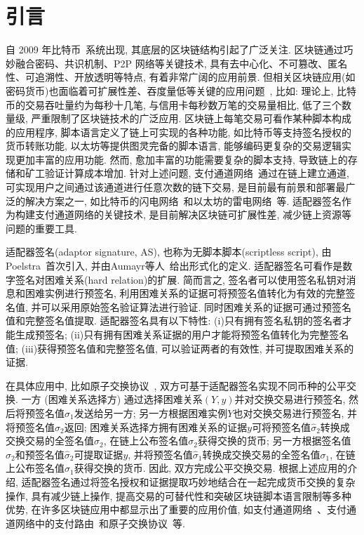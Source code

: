 \documentclass[review]{jcr}
\begin{document}

\section{引言}
自 2009 年比特币~\cite{Nak08}系统出现, 其底层的区块链结构引起了广泛关注. 区块链通过巧妙融合密码、共识机制、P2P 网络等关键技术, 具有去中心化、不可篡改、匿名性、可追溯性、开放透明等特点, 有着非常广阔的应用前景. 但相关区块链应用(如密码货币)也面临着可扩展性差、吞度量低等关键的应用问题~\cite{BanoSAAMMD19,GudgeonMRMG19,ZamyatinAZKMKK19,AumayrEEFHMMR20,SG2018}, 比如: 理论上, 比特币的交易吞吐量约为每秒十几笔, 与信用卡每秒数万笔的交易量相比, 低了三个数量级, 严重限制了区块链技术的广泛应用. 区块链上每笔交易可看作某种脚本构成的应用程序, 脚本语言定义了链上可实现的各种功能, 如比特币等支持签名授权的货币转账功能, 以太坊等提供图灵完备的脚本语言, 能够编码更复杂的交易逻辑实现更加丰富的应用功能. 然而, 愈加丰富的功能需要复杂的脚本支持, 导致链上的存储和矿工验证计算成本增加. 针对上述问题, 支付通道网络~\cite{PC2018}通过在链上建立通道, 可实现用户之间通过该通道进行任意次数的链下交易, 是目前最有前景和部署最广泛的解决方案之一, 如比特币的闪电网络~\cite{PD2016}和以太坊的雷电网络~\cite{raidEX}等. 适配器签名作为构建支付通道网络的关键技术, 是目前解决区块链可扩展性差, 减少链上资源等问题的重要工具. 

适配器签名(adaptor signature, AS), 也称为无脚本脚本(scriptless script), 由Poelstra~\cite{Poelstra2016}首次引入, 并由Aumayr等人~\cite{AumayrEEFHMMR20}给出形式化的定义. 适配器签名可看作是数字签名对困难关系(hard relation)的扩展. 简而言之, 签名者可以使用签名私钥对消息和困难实例进行预签名, 利用困难关系的证据可将预签名值转化为有效的完整签名值, 并可以采用原始签名验证算法进行验证. 同时困难关系的证据可通过预签名值和完整签名值提取. 适配器签名具有以下特性: (i)只有拥有签名私钥的签名者才能生成预签名; (ii)只有拥有困难关系证据的用户才能将预签名值转化为完整签名值; (iii)获得预签名值和完整签名值, 可以验证两者的有效性, 并可提取困难关系的证据. 

在具体应用中, 比如原子交换协议~\cite{Nolan2013,Poelstra2017,DeshpandeH20,Gugger20}, 双方可基于适配器签名实现不同币种的公平交换. 一方 (困难关系选择方) 通过选择困难关系$(Y,y)$并对交换交易进行预签名, 然后将预签名值$\hat{\sigma}_1$发送给另一方; 另一方根据困难实例$Y$也对交换交易进行预签名, 并将预签名值$\hat{\sigma}_2$返回;  困难关系选择方拥有困难关系的证据$y$可将预签名值$\hat{\sigma}_2$转换成交换交易的全签名值$\sigma_2$, 在链上公布签名值$\sigma_2$获得交换的货币; 另一方根据签名值$\sigma_2$和预签名值$\hat{\sigma}_2$可提取证据$y$, 并将预签名值$\hat{\sigma}_1$转换成交换交易的全签名值$\sigma_1$, 在链上公布签名值$\sigma_1$获得交换的货币. 因此, 双方完成公平交换交易. 根据上述应用的介绍, 适配器签名通过将签名授权和证据提取巧妙地结合在一起完成货币交换的复杂操作, 具有减少链上操作, 提高交易的可替代性和突破区块链脚本语言限制等多种优势, 在许多区块链应用中都显示出了重要的应用价值, 如支付通道网络~\cite{DeckerW15,PC2018,AumayrEEFHMMR20}、支付通道网络中的支付路由~\cite{EckeyFHR20,MalavoltaMSKM19,MillerBBKM19}和原子交换协议~\cite{Nolan2013,Poelstra2017,DeshpandeH20,Gugger20}等. 
\end{document}
